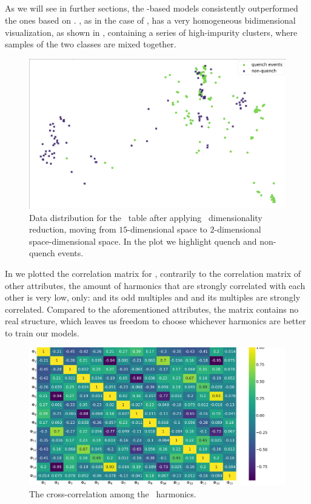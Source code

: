 \subsection{\phin}
\label{sec:phi}
As we will see in further sections, the \phin-based models consistently outperformed the ones based
on \bn. \phin, as in the case of \bn, has a very homogeneous bidimensional visualization, as shown in
, containing a series of high-impurity clusters, where samples of the two classes are mixed together.
\begin{figure}[!ht]
	\centering
	\includegraphics[width=0.7\linewidth]{img/Phi_distribution.png}
	\caption{Data distribution for the \phin\ table after applying \pca\ dimensionality
		reduction, moving from $15$-dimensional space to $2$-dimensional space-dimensional
		space. In the plot we highlight quench and non-quench events.} \label{fig:phi-dist}
\end{figure}

In  we plotted the correlation matrix for \phin, contrarily to the correlation
matrix of other attributes, the amount of harmonics that are strongly correlated with each other is very
low, only: \phin[2] and its odd multiples and \phin[4] and its multiples are strongly correlated. Compared to the
aforementioned attributes, the matrix contains no real structure, which leaves us freedom to choose
whichever harmonics are better to train our models.
\begin{figure}[!ht]
	\centering
	\includegraphics[width=\linewidth]{img/Phi_corr_matrix.png}
	\caption{The cross-correlation among the \phin\ harmonics.} \label{fig:phi-corr}
\end{figure}

